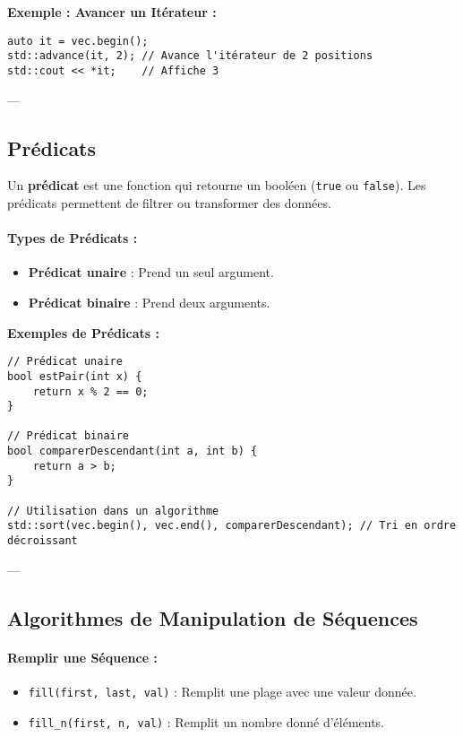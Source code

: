 \textbf{Exemple : Avancer un Itérateur :}
\begin{tcolorbox}[colframe=blue!50!black, colback=blue!5!white, title=Exemple d'Avancer un Itérateur]
\begin{verbatim}
auto it = vec.begin();
std::advance(it, 2); // Avance l'itérateur de 2 positions
std::cout << *it;    // Affiche 3
\end{verbatim}
\end{tcolorbox}

---

\subsection{ Prédicats}
Un \textbf{prédicat} est une fonction qui retourne un booléen (\texttt{true} ou \texttt{false}). Les prédicats permettent de filtrer ou transformer des données.

\paragraph{Types de Prédicats :}
\begin{itemize}
    \item \textbf{Prédicat unaire} : Prend un seul argument.
    \item \textbf{Prédicat binaire} : Prend deux arguments.
\end{itemize}

\textbf{Exemples de Prédicats :}
\begin{tcolorbox}[colframe=blue!50!black, colback=blue!5!white, title=Exemples de Prédicats]
\begin{verbatim}
// Prédicat unaire
bool estPair(int x) {
    return x % 2 == 0;
}

// Prédicat binaire
bool comparerDescendant(int a, int b) {
    return a > b;
}

// Utilisation dans un algorithme
std::sort(vec.begin(), vec.end(), comparerDescendant); // Tri en ordre décroissant
\end{verbatim}
\end{tcolorbox}

---

\subsection{ Algorithmes de Manipulation de Séquences}
\paragraph{Remplir une Séquence :}
\begin{itemize}
    \item \texttt{fill(first, last, val)} : Remplit une plage avec une valeur donnée.
    \item \texttt{fill\_n(first, n, val)} : Remplit un nombre donné d’éléments.
\end{itemize}

